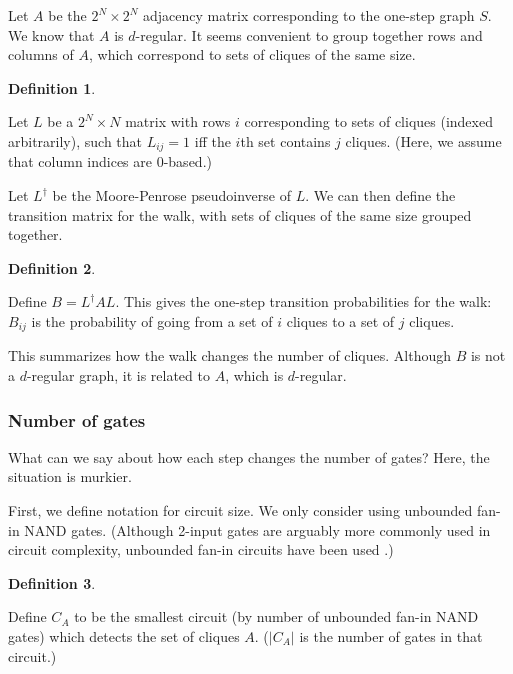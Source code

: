 \documentclass[12pt]{article}
\theoremstyle{definition}
\newtheorem{defn}{Definition}[section]
\begin{document}
Let $A$ be the $2^N{\times}2^N$ adjacency matrix corresponding to the one-step graph $S$.
We know that $A$ is $d$-regular.
It seems convenient to group together rows and columns of $A$,
which correspond to sets of cliques of the same size.

\begin{defn} \label{defn:levels}

Let $L$ be a $2^N{\times}N$ matrix with rows $i$ corresponding to sets of cliques (indexed arbitrarily), such that
$L_{ij} = 1$ iff the $i$th set contains $j$ cliques. (Here, we assume that column indices are 0-based.)

\end{defn}

Let $L^{\dagger}$ be the Moore-Penrose pseudoinverse of $L$.
We can then define the transition matrix for the walk, with sets of cliques of the same size grouped together.

\begin{defn} \label{defn:B}

Define
$B = L^{\dagger}AL$. This gives the one-step transition probabilities for the walk: $B_{ij}$ is the
probability of going from a set of $i$ cliques to a set of $j$ cliques.

\end{defn}

This summarizes how the walk changes the number of cliques.
Although $B$ is not a $d$-regular graph, it is related to $A$, which is $d$-regular.

\subsubsection{Number of gates}

What can we say about how each step changes the number of gates? Here, the situation is murkier.

First, we define notation for circuit size. 
We only consider using unbounded fan-in NAND gates. (Although
2-input gates are arguably more commonly used in circuit complexity,
unbounded fan-in circuits have been used
\cite{wegener1991complexity}\cite{allender1994depth}.)

\begin{defn} \label{defn:circuitSize}

Define $C_A$ to be the smallest circuit (by number of unbounded fan-in NAND gates)
which detects the set of cliques $A$. ($|C_A|$ is the number of gates in that circuit.)

\end{defn}
\end{document}
